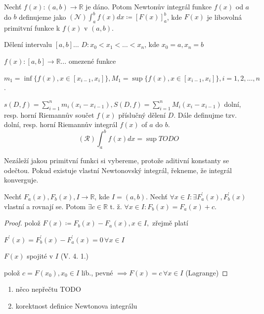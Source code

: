 \begin{definice}
  Nechť $f(x): (a,b)\to \mathbb R$ je dáno. Potom Newtonův integrál funkce $f(x)$ od $a$ do $b$ definujeme jako $(\mathscr N)\int_a^b f(x) dx \coloneq [F(x)]_a^b$, kde $F(x)$ je libovolná primitvní funkce k $f(x)$ v $(a, b)$.
\end{definice}

\begin{definice}
  Dělení intervalu $[a,b]\dots$ $D: x_0 <x_1<\dots<x_n$, kde $x_0 = a, x_n = b$

  $f(x): [a,b] \to \mathbb R \dots$ omezené funkce

  $m_1 = \inf\{f(x), x \in [x_{i-1}, x_i]\}, M_1 = \sup\{f(x), x \in [x_{i-1}, x_i]\}, i = 1, 2, \dots, n$.

  $s(D, f) = \sum_{i=1}^{n} m_i (x_i - x_{i-1}), S(D, f) = \sum_{i=1}^{n} M_i (x_i - x_{i-1})$ dolní, resp. horní Riemannův součet $f(x)$ příslučný dělení $D$. Dále definujme tzv. dolní, resp. horní Riemannův integrál $f(x)$ of $a$ do $b$.
  $$(\mathscr R)\int_a^b f(x) dx = \sup TODO$$
\end{definice}

\begin{poznamka}
  Nezáleží jakou primitvní funkci si vybereme, protože aditivní konstanty se odečtou. Pokud existuje vlastní Newtonovský integrál, řekneme, že integrál konverguje.
\end{poznamka}

\begin{lemma}
  Nechť $F_a(x), F_b(x), I \to \mathbb R$, kde $I = (a,b)$. Nechť $\forall x \in I: \exists F_a^\prime(x), F_b^\prime(x)$ vlastní a rovnají se. Potom $\exists c \in \mathbb R$ t. ž. $\forall x \in I: F_b(x) = F_a(x) + c$.
\end{lemma}

\begin{proof}
  polož $F(x) \coloneq F_b(x)-F_a(x), x \in I,$ zřejmě platí

  $F^\prime(x) = F^\prime_b(x)-F^\prime_a(x) = 0 \, \forall x \in I$

  $F(x)$ spojité v $I$ (V. 4. 1.)

  polož $c = F(x_0), x_0 \in I$ lib., pevné $\implies F(x) = c \,\forall x \in I$ (Lagrange)
\end{proof}

\begin{dusledek}
  \begin{enumerate}
    \item něco nepřečtu TODO
    \item korektnost definice Newtonova integrálu
  \end{enumerate}
\end{dusledek}

